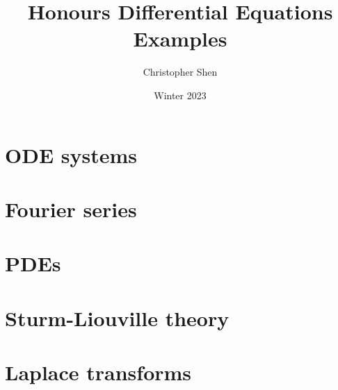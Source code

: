 \documentclass{article}
\title{Honours Differential Equations Examples}
\author{Christopher Shen}
\date{Winter 2023}
\begin{document}
\maketitle
\newpage

\tableofcontents
\newpage

\section{ODE systems}

\section{Fourier series}

\section{PDEs}

\section{Sturm-Liouville theory}

\newpage

\section{Laplace transforms}
\end{document}
